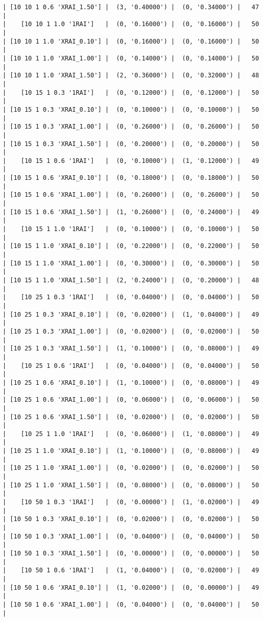 \documentclass{article}
\begin{document}
\begin{verbatim}
| [10 10 1 0.6 'XRAI_1.50'] |  (3, '0.40000') |  (0, '0.34000') |   47  |
|    [10 10 1 1.0 '1RAI']   |  (0, '0.16000') |  (0, '0.16000') |   50  |
| [10 10 1 1.0 'XRAI_0.10'] |  (0, '0.16000') |  (0, '0.16000') |   50  |
| [10 10 1 1.0 'XRAI_1.00'] |  (0, '0.14000') |  (0, '0.14000') |   50  |
| [10 10 1 1.0 'XRAI_1.50'] |  (2, '0.36000') |  (0, '0.32000') |   48  |
|    [10 15 1 0.3 '1RAI']   |  (0, '0.12000') |  (0, '0.12000') |   50  |
| [10 15 1 0.3 'XRAI_0.10'] |  (0, '0.10000') |  (0, '0.10000') |   50  |
| [10 15 1 0.3 'XRAI_1.00'] |  (0, '0.26000') |  (0, '0.26000') |   50  |
| [10 15 1 0.3 'XRAI_1.50'] |  (0, '0.20000') |  (0, '0.20000') |   50  |
|    [10 15 1 0.6 '1RAI']   |  (0, '0.10000') |  (1, '0.12000') |   49  |
| [10 15 1 0.6 'XRAI_0.10'] |  (0, '0.18000') |  (0, '0.18000') |   50  |
| [10 15 1 0.6 'XRAI_1.00'] |  (0, '0.26000') |  (0, '0.26000') |   50  |
| [10 15 1 0.6 'XRAI_1.50'] |  (1, '0.26000') |  (0, '0.24000') |   49  |
|    [10 15 1 1.0 '1RAI']   |  (0, '0.10000') |  (0, '0.10000') |   50  |
| [10 15 1 1.0 'XRAI_0.10'] |  (0, '0.22000') |  (0, '0.22000') |   50  |
| [10 15 1 1.0 'XRAI_1.00'] |  (0, '0.30000') |  (0, '0.30000') |   50  |
| [10 15 1 1.0 'XRAI_1.50'] |  (2, '0.24000') |  (0, '0.20000') |   48  |
|    [10 25 1 0.3 '1RAI']   |  (0, '0.04000') |  (0, '0.04000') |   50  |
| [10 25 1 0.3 'XRAI_0.10'] |  (0, '0.02000') |  (1, '0.04000') |   49  |
| [10 25 1 0.3 'XRAI_1.00'] |  (0, '0.02000') |  (0, '0.02000') |   50  |
| [10 25 1 0.3 'XRAI_1.50'] |  (1, '0.10000') |  (0, '0.08000') |   49  |
|    [10 25 1 0.6 '1RAI']   |  (0, '0.04000') |  (0, '0.04000') |   50  |
| [10 25 1 0.6 'XRAI_0.10'] |  (1, '0.10000') |  (0, '0.08000') |   49  |
| [10 25 1 0.6 'XRAI_1.00'] |  (0, '0.06000') |  (0, '0.06000') |   50  |
| [10 25 1 0.6 'XRAI_1.50'] |  (0, '0.02000') |  (0, '0.02000') |   50  |
|    [10 25 1 1.0 '1RAI']   |  (0, '0.06000') |  (1, '0.08000') |   49  |
| [10 25 1 1.0 'XRAI_0.10'] |  (1, '0.10000') |  (0, '0.08000') |   49  |
| [10 25 1 1.0 'XRAI_1.00'] |  (0, '0.02000') |  (0, '0.02000') |   50  |
| [10 25 1 1.0 'XRAI_1.50'] |  (0, '0.08000') |  (0, '0.08000') |   50  |
|    [10 50 1 0.3 '1RAI']   |  (0, '0.00000') |  (1, '0.02000') |   49  |
| [10 50 1 0.3 'XRAI_0.10'] |  (0, '0.02000') |  (0, '0.02000') |   50  |
| [10 50 1 0.3 'XRAI_1.00'] |  (0, '0.04000') |  (0, '0.04000') |   50  |
| [10 50 1 0.3 'XRAI_1.50'] |  (0, '0.00000') |  (0, '0.00000') |   50  |
|    [10 50 1 0.6 '1RAI']   |  (1, '0.04000') |  (0, '0.02000') |   49  |
| [10 50 1 0.6 'XRAI_0.10'] |  (1, '0.02000') |  (0, '0.00000') |   49  |
| [10 50 1 0.6 'XRAI_1.00'] |  (0, '0.04000') |  (0, '0.04000') |   50  |

\end{verbatim}
\end{document}
